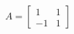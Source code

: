 \documentclass[preview]{standalone}
\begin{document}
\begin{align*}
A = \begin{bmatrix} 1 & 1 \\ -1 & 1 \end{bmatrix}
\end{align*}
\end{document}
